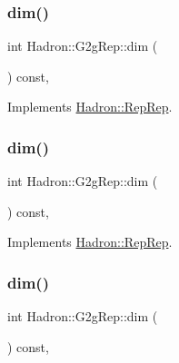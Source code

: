 \subsubsection{\texorpdfstring{dim()}{dim()}\hspace{0.1cm}{\footnotesize\ttfamily [1/5]}}
{\footnotesize\ttfamily int Hadron\+::\+G2g\+Rep\+::dim (\begin{DoxyParamCaption}{ }\end{DoxyParamCaption}) const\hspace{0.3cm}{\ttfamily [inline]}, {\ttfamily [virtual]}}



Implements \mbox{\hyperlink{structHadron_1_1RepRep_a92c8802e5ed7afd7da43ccfd5b7cd92b}{Hadron\+::\+Rep\+Rep}}.

\mbox{\label{structHadron_1_1G2gRep_a8aa2fce05b77da3aab118ec1e5f16687}} 
\subsubsection{\texorpdfstring{dim()}{dim()}\hspace{0.1cm}{\footnotesize\ttfamily [2/5]}}
{\footnotesize\ttfamily int Hadron\+::\+G2g\+Rep\+::dim (\begin{DoxyParamCaption}{ }\end{DoxyParamCaption}) const\hspace{0.3cm}{\ttfamily [inline]}, {\ttfamily [virtual]}}



Implements \mbox{\hyperlink{structHadron_1_1RepRep_a92c8802e5ed7afd7da43ccfd5b7cd92b}{Hadron\+::\+Rep\+Rep}}.

\mbox{\label{structHadron_1_1G2gRep_a8aa2fce05b77da3aab118ec1e5f16687}} 
\subsubsection{\texorpdfstring{dim()}{dim()}\hspace{0.1cm}{\footnotesize\ttfamily [3/5]}}
{\footnotesize\ttfamily int Hadron\+::\+G2g\+Rep\+::dim (\begin{DoxyParamCaption}{ }\end{DoxyParamCaption}) const\hspace{0.3cm}{\ttfamily [inline]}, {\ttfamily [virtual]}}



